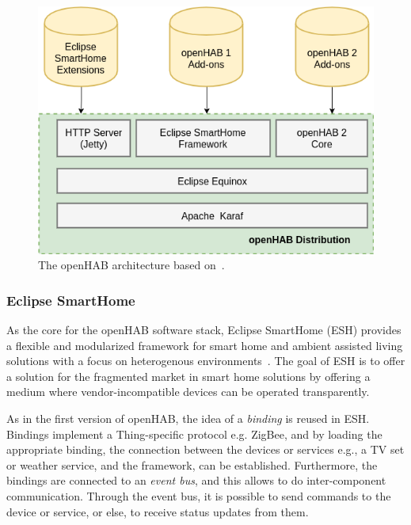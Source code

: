 \documentclass[12pt]{article}
\begin{document}
\begin{figure} [ht] 
\begin{center}
\includegraphics[width=\textwidth]{oh_architecture}
\caption{The openHAB architecture based on~\cite{openhab_02}.}
\label{fig:oh_architecture}
\end{center}
\end{figure}

\subsubsection{Eclipse SmartHome}

As the core for the openHAB software stack, Eclipse SmartHome (ESH) provides a flexible and modularized framework for smart home and ambient assisted living solutions with a focus on heterogenous environments~\cite{esh_01}. The goal of ESH is to offer a solution for the fragmented market in smart home solutions by offering a medium where vendor-incompatible devices can be operated transparently.

As in the first version of openHAB, the idea of a \emph{binding} is reused in ESH. Bindings implement a Thing-specific protocol e.g. ZigBee, and by loading the appropriate binding, the connection between the devices or services e.g., a TV set or weather service, and the framework, can be established. Furthermore, the bindings are connected to an \emph{event bus}, and this allows to do inter-component communication. Through the event bus, it is possible to send commands to the device or service, or else, to receive status updates from them.
\end{document}
